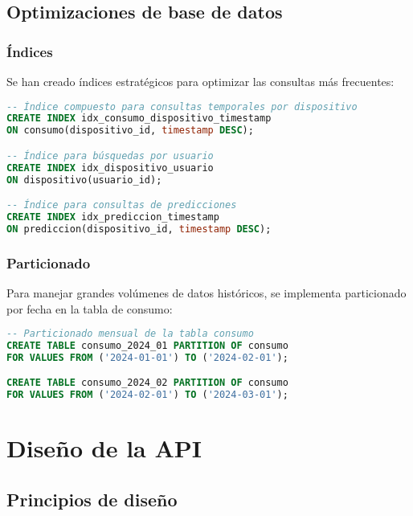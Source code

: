 \subsection{Optimizaciones de base de datos}

\subsubsection{Índices}

Se han creado índices estratégicos para optimizar las consultas más frecuentes:

\begin{lstlisting}[language=SQL, caption=Índices de optimización]
-- Índice compuesto para consultas temporales por dispositivo
CREATE INDEX idx_consumo_dispositivo_timestamp 
ON consumo(dispositivo_id, timestamp DESC);

-- Índice para búsquedas por usuario
CREATE INDEX idx_dispositivo_usuario 
ON dispositivo(usuario_id);

-- Índice para consultas de predicciones
CREATE INDEX idx_prediccion_timestamp 
ON prediccion(dispositivo_id, timestamp DESC);
\end{lstlisting}

\subsubsection{Particionado}

Para manejar grandes volúmenes de datos históricos, se implementa particionado por fecha en la tabla de consumo:

\begin{lstlisting}[language=SQL, caption=Particionado de tabla consumo]
-- Particionado mensual de la tabla consumo
CREATE TABLE consumo_2024_01 PARTITION OF consumo
FOR VALUES FROM ('2024-01-01') TO ('2024-02-01');

CREATE TABLE consumo_2024_02 PARTITION OF consumo
FOR VALUES FROM ('2024-02-01') TO ('2024-03-01');
\end{lstlisting}

\section{Diseño de la API}

\subsection{Principios de diseño}


